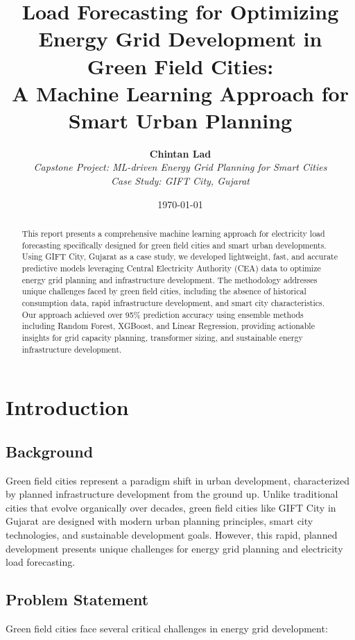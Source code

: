 \documentclass[12pt,a4paper]{article}
\title{\textbf{Load Forecasting for Optimizing Energy Grid Development in Green Field Cities: \\
A Machine Learning Approach for Smart Urban Planning}}
\author{
    \textbf{Chintan Lad} \\
    \textit{Capstone Project: ML-driven Energy Grid Planning for Smart Cities} \\
    \textit{Case Study: GIFT City, Gujarat}
}
\date{\today}
\begin{document}
\maketitle

\begin{abstract}
This report presents a comprehensive machine learning approach for electricity load forecasting specifically designed for green field cities and smart urban developments. Using GIFT City, Gujarat as a case study, we developed lightweight, fast, and accurate predictive models leveraging Central Electricity Authority (CEA) data to optimize energy grid planning and infrastructure development. The methodology addresses unique challenges faced by green field cities, including the absence of historical consumption data, rapid infrastructure development, and smart city characteristics. Our approach achieved over 95\% prediction accuracy using ensemble methods including Random Forest, XGBoost, and Linear Regression, providing actionable insights for grid capacity planning, transformer sizing, and sustainable energy infrastructure development.
\end{abstract}

\tableofcontents
\newpage

\section{Introduction}

\subsection{Background}
Green field cities represent a paradigm shift in urban development, characterized by planned infrastructure development from the ground up. Unlike traditional cities that evolve organically over decades, green field cities like GIFT City in Gujarat are designed with modern urban planning principles, smart city technologies, and sustainable development goals. However, this rapid, planned development presents unique challenges for energy grid planning and electricity load forecasting.

\subsection{Problem Statement}
Green field cities face several critical challenges in energy grid development:
\end{document}

